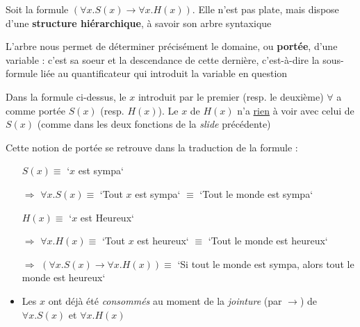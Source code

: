 	
\begin{frame}

Soit la formule $(\forall x. S(x) \rightarrow \forall x. H(x))$. \pause Elle n'est pas plate, mais dispose d'une \textbf{structure hiérarchique}, à savoir son arbre syntaxique\pause\newline

L'arbre nous permet de déterminer précisément le domaine, ou \textbf{portée}, d'une variable : c'est sa soeur et la descendance de cette dernière\pause, c'est-à-dire la sous-formule liée au quantificateur qui introduit la variable en question\pause\newline

Dans la formule ci-dessus, le $x$ introduit par le premier (resp. le deuxième) $\forall$ a comme portée $S(x)$ (resp. $H(x)$). \pause Le $x$ de $H(x)$ n'a \underline{rien} à voir avec celui de $S(x)$ (comme dans les deux fonctions de la \textit{slide} précédente)

\end{frame}


	
\begin{frame}

Cette notion de portée se retrouve dans la traduction de la formule :
\vspace{2mm}
\begin{itemize}
\item[] $S(x) \equiv$ `$x$ est sympa`\pause
\item[$\Rightarrow$] $\forall x. S(x) \equiv$ `Tout $x$ est sympa` $\equiv$ `Tout le monde est sympa`\pause
\end{itemize}
\vspace{1mm}
\begin{itemize}
\item[] $H(x) \equiv$ `$x$ est Heureux`\pause
\item[$\Rightarrow$] $\forall x. H(x) \equiv$ `Tout $x$ est heureux` $\equiv$ `Tout le monde est heureux`\pause
\end{itemize}
\vspace{1mm}
\begin{itemize}
\item[$\Rightarrow$] $(\forall x. S(x) \rightarrow \forall x. H(x)) \equiv$ `Si tout le monde est sympa, alors tout le monde est heureux`\pause
\end{itemize}
\vspace{1mm}
\begin{itemize}
\item Les $x$ ont déjà été \textit{consommés} au moment de la \textit{jointure} (par $\rightarrow$) de $\forall x. S(x)$ et $\forall x. H(x)$
\end{itemize}

\end{frame}



